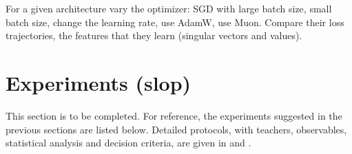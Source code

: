 \documentclass[11pt]{article}
\theoremstyle{definition}
\numberwithin{equation}{section}
\begin{document}
For a given architecture vary the optimizer: SGD with large batch size, small batch size, change the learning rate, use AdamW, use Muon. Compare their loss trajectories, the features that they learn (singular vectors and values).





\section{Experiments (slop)}\label{sec:experiments-slop}

This section is to be completed. For reference, the experiments suggested in the previous sections are listed below. Detailed protocols, with teachers, observables, statistical analysis and decision criteria, are given in \citet[Sections~6--10]{hfl_surrogate} and \citet[Sections~9--11]{hfl_local}.
\end{document}
